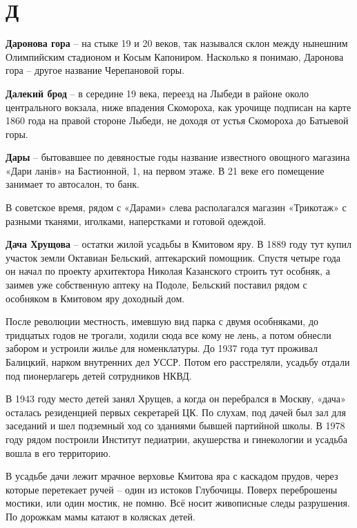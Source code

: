 \chapter*{Д}


\textbf{Даронова гора} – на стыке 19 и 20 веков, так назывался склон между нынешним Олимпийским стадионом и Косым Капониром. Насколько я понимаю, Даронова гора – другое название Черепановой горы.\\

\medskip


\textbf{Далекий брод} – в середине 19 века, переезд на Лыбеди в районе около центрального вокзала, ниже впадения Скомороха, как урочище подписан на карте 1860 года на правой стороне Лыбеди, не доходя от устья Скомороха до Батыевой горы.\\

\medskip

\textbf{Дары} – бытовавшее по девяностые годы название известного овощного магазина «Дари ланів» на Бастионной, 1, на первом этаже. В 21 веке его помещение занимает то автосалон, то банк. 

В советское время, рядом с «Дарами» слева располагался магазин «Трикотаж» с разными тканями, иголками, наперстками и готовой одеждой.\\

\medskip

\textbf{Дача Хрущова} – остатки жилой усадьбы в Кмитовом яру. В 1889 году тут купил участок земли Октавиан Бельский, аптекарский помощник. Спустя четыре года он начал по проекту архитектора Николая Казанского строить тут особняк, а заимев уже собственную аптеку на Подоле, Бельский поставил рядом с особняком в Кмитовом яру доходный дом.

После революции местность, имевшую вид парка с двумя особняками, до тридцатых годов не трогали, ходили сюда все кому не лень, а потом обнесли забором и устроили жилье для номенклатуры. До 1937 года тут проживал Балицкий, нарком внутренних дел УССР. Потом его расстреляли, усадьбу отдали под пионерлагерь детей сотрудников НКВД.

В 1943 году место детей занял Хрущев, а когда он перебрался в Москву, «дача» осталась резиденцией первых секретарей ЦК. По слухам, под дачей был зал для заседаний и шел подземный ход со зданиями бывшей партийной школы. В 1978 году рядом построили Институт педиатрии, акушерства и гинекологии и усадьба вошла в его территорию.

В усадьбе дачи лежит мрачное верховье Кмитова яра с каскадом прудов, через которые перетекает ручей – один из истоков Глубочицы. Поверх переброшены мостики, или один мостик, не помню. Всё носит живописные следы разрушения. По дорожкам мамы катают в колясках детей.\\


